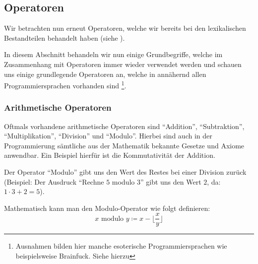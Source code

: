\subsection{Operatoren} \functionalMark \imperativeMark \oopMark
	
	Wir betrachten nun erneut Operatoren, welche wir bereits bei den lexikalischen Bestandteilen behandelt haben (siehe ).
	
	In diesem Abschnitt behandeln wir nun einige Grundbegriffe, welche im Zusammenhang mit Operatoren immer wieder verwendet werden und schauen uns einige grundlegende Operatoren an, welche in annähernd allen Programmiersprachen vorhanden sind \footnote{Ausnahmen bilden hier manche esoterische Programmiersprachen wie beispielsweise Brainfuck. Siehe hierzu }.
	
	\subsubsection{Arithmetische Operatoren}
		Oftmals vorhandene arithmetische Operatoren sind \enquote{Addition}, \enquote{Subtraktion}, \enquote{Multiplikation}, \enquote{Division} und \enquote{Modulo}. Hierbei sind auch in der Programmierung sämtliche aus der Mathematik bekannte Gesetze und Axiome anwendbar. Ein Beispiel hierfür ist die Kommutativität der Addition.
		
		Der Operator \enquote{Modulo} gibt uns den Wert des Restes bei einer Division zurück (Beispiel: Der Ausdruck \enquote{Rechne $ 5 $ modulo $ 3 $} gibt uns den Wert $ 2 $, da: $ 1 \cdot 3 + 2 = 5 $).
		
		Mathematisch kann man den Modulo-Operator wie folgt definieren:
		\begin{equation*}
			x \text{ modulo } y \coloneqq x - \lfloor \frac{x}{y} \rfloor
		\end{equation*}
	
